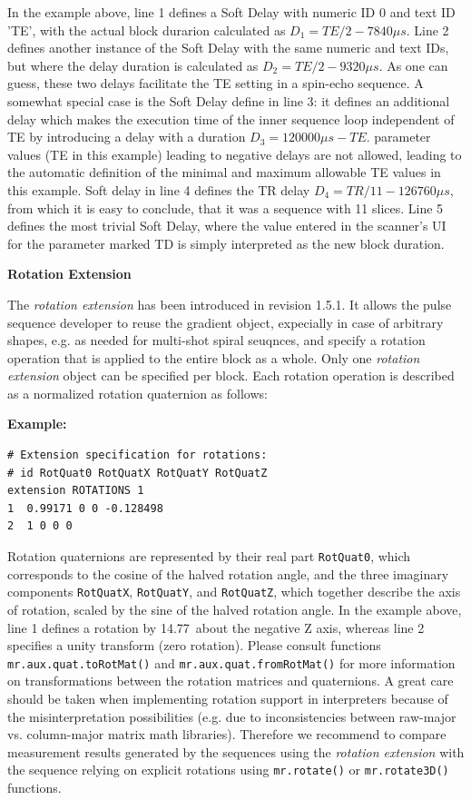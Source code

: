 \documentclass{article}
\begin{document}
In the example above, line 1 defines a Soft Delay with numeric ID 0 and text ID 'TE', with the actual block durarion calculated as $D_1=TE/2-7840 \mu s$. Line 2 defines another instance of the Soft Delay with the same numeric and text IDs, but where the delay duration is calculated as $D_2=TE/2-9320 \mu s$. As one can guess, these two delays facilitate the TE setting in a spin-echo sequence. A somewhat special case is the Soft Delay define in line 3: it defines an additional delay which makes the execution time of the inner sequence loop independent of TE by introducing a delay with a duration $D_3=120000\mu s - TE$. 
parameter values (TE in this example) leading to negative delays are not allowed, leading to the automatic definition of the minimal and maximum allowable TE values in this example. Soft delay in line 4 defines the TR delay $D_4=TR/11-126760 \mu s$, from which it is easy to conclude, that it was a sequence with 11 slices. Line 5 defines the most trivial Soft Delay, where the value entered in the scanner's UI for the parameter marked TD is simply interpreted as the new block duration. 

\textbf{Rotation Extension}

The \textit{rotation extension} has been introduced in revision 1.5.1. It allows the pulse sequence developer to reuse the gradient object, expecially in case of arbitrary shapes, e.g. as needed for multi-shot spiral seuqnces, and specify a rotation operation that is applied to the entire block as a whole. Only one \textit{rotation extension} object can be specified per block. Each rotation operation is described as a normalized rotation quaternion as follows:

\begin{minipage}{\textwidth}
\textbf{Example:}
\begin{lstlisting}
# Extension specification for rotations:
# id RotQuat0 RotQuatX RotQuatY RotQuatZ
extension ROTATIONS 1
1  0.99171 0 0 -0.128498
2  1 0 0 0
\end{lstlisting}
\end{minipage}

Rotation quaternions are represented by their real part \verb.RotQuat0., which corresponds to the cosine of the halved rotation angle, and the three imaginary components \verb.RotQuatX., \verb.RotQuatY., and \verb.RotQuatZ., which together describe the axis of rotation, scaled by the sine of the halved rotation angle. In the example above, line 1 defines a rotation by 14.77\textdegree\, about the negative Z axis, whereas line 2 specifies a unity transform (zero rotation). Please consult functions \lstinline{mr.aux.quat.toRotMat()} and \lstinline{mr.aux.quat.fromRotMat()} for more information on transformations between the rotation matrices and quaternions. A great care should be taken when implementing rotation support in interpreters because of the misinterpretation possibilities (e.g. due to inconsistencies between raw-major vs. column-major matrix math libraries). Therefore we recommend to compare measurement results generated by the sequences using the \textit{rotation extension} with the sequence relying on explicit rotations using \lstinline{mr.rotate()} or \lstinline{mr.rotate3D()} functions.
\end{document}
